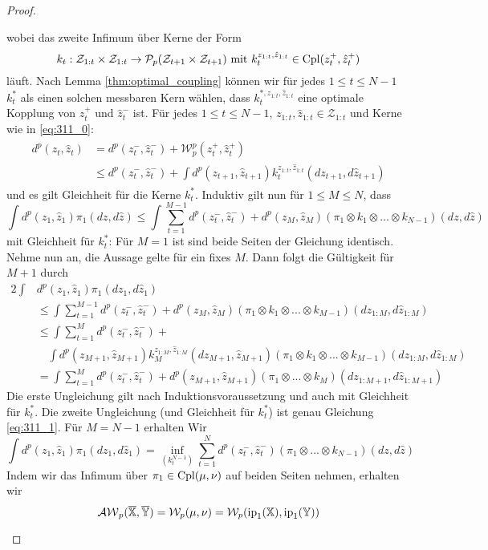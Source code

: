 \begin{proof}
\begin{enumerate}
wobei das zweite Infimum über Kerne der Form
\begin{equation}\label{eq:311_0}
k_t: \mathcal{Z}_{1:t}\times \mathcal{Z}_{1:t} \rightarrow \mathcal{P}_p(\mathcal{Z}_{t+1}\times \mathcal{Z}_{t+1}) \text{ mit } k_t^{z_{1:t}, \hat{z}_{1:t}} \in \operatorname{Cpl}(z_t^+, \hat{z}_t^+)
\end{equation}
läuft. Nach Lemma \ref{thm:optimal_coupling} können wir für jedes $1 \leq t \leq N-1$ $k_t^*$ als einen solchen messbaren Kern wählen, dass $k_t^{*, z_{1:t}, \hat{z}_{1:t}}$ eine optimale Kopplung von $z_t^+$ und $\hat{z}_t^-$ ist. Für jedes $1\leq t\leq N-1$, $z_{1:t}, \hat{z}_{1:t} \in \mathcal{Z}_{1:t}$ und Kerne wie in \ref{eq:311_0}:
\begin{align}\label{eq:311_1}
    \begin{split}
    d^p(z_t, \hat{z}_t) &= d^p(z_t^-, \hat{z}_t^-) + \mathcal{W}_p^p(z_t^+, \hat{z}_t^+) \\
    &\leq d^p(z_t^-, \hat{z}_t^-) + \int d^p(z_{t+1}, \hat{z}_{t+1}) k_t^{z_{1:t}, \hat{z}_{1:t}}(dz_{t+1}, d\hat{z}_{t+1})
    \end{split}
\end{align}
und es gilt Gleichheit für die Kerne $k_t^*$. Induktiv gilt nun für $1 \leq M \leq N$, dass
$$\int d^p(z_1, \hat{z}_1)\pi_1(dz, d\hat{z}) \leq \int \sum_{t=1}^{M-1} d^p(z_t^-, \hat{z}_t^-) +d^p(z_M, \hat{z}_M)(\pi_1 \otimes k_1 \otimes ... \otimes k_{N-1})(dz, d\hat{z})$$
mit Gleichheit für $k_t^*$: Für $M=1$ ist sind beide Seiten der Gleichung identisch. Nehme nun an, die Aussage gelte für ein fixes $M$. Dann folgt die Gültigkeit für $M+1$ durch
\begin{alignat*}{2}
\int &d^p(z_1, \hat{z}_1)\pi_1(dz_1, d\hat{z}_1) \\
&\leq \int \sum_{t=1}^{M-1} d^p(z_t^-, \hat{z}_t^-) +d^p(z_M, \hat{z}_M)(\pi_1 \otimes k_1 \otimes ... \otimes k_{M-1})(dz_{1:M}, d\hat{z}_{1:M}) \\
&\leq\int \sum_{t=1}^{M}d^p(z_t^-, \hat{z}_t^-) + \\
    &\quad\int d^p(z_{M+1}, \hat{z}_{M+1}) k_M^{z_{1:M}, \hat{z}_{1:M}}(dz_{M+1}, \hat{z}_{M+1}) (\pi_1 \otimes k_1 \otimes ... \otimes k_{M-1})(dz_{1:M}, d\hat{z}_{1:M})\\
&= \int \sum_{t=1}^{M}d^p(z_t^-, \hat{z}_t^-) + d^p(z_{M+1}, \hat{z}_{M+1})(\pi_1 \otimes ...\otimes k_M)(dz_{1:M+1}, d\hat{z}_{1:M+1})
\end{alignat*}
Die erste Ungleichung gilt nach Induktionsvoraussetzung und auch mit Gleichheit für $k_t^*$. Die zweite Ungleichung (und Gleichheit für $k_t^*$) ist genau Gleichung \ref{eq:311_1}.
Für $M=N-1$ erhalten Wir
$$\int d^p(z_1, \hat{z}_1)\pi_1(dz_1, d\hat{z}_1) = \inf_{(k_t^{N-1})} \sum_{t=1}^Nd^p(z_t^-, \hat{z}_t^-)(\pi_1 \otimes ... \otimes k_{N-1})(dz, d\hat{z})$$
Indem wir das Infimum über $\pi_1 \in \operatorname{Cpl}(\mu, \nu)$ auf beiden Seiten nehmen, erhalten wir
$$\mathcal{AW}_p(\overline{\mathbb{X}}, \overline{\mathbb{Y}}) = \mathcal{W}_p(\mu, \nu) = \mathcal{W}_p(\operatorname{ip}_1(\mathbb{X}), \operatorname{ip}_1(\mathbb{Y}))$$
\end{enumerate}
\end{proof}

